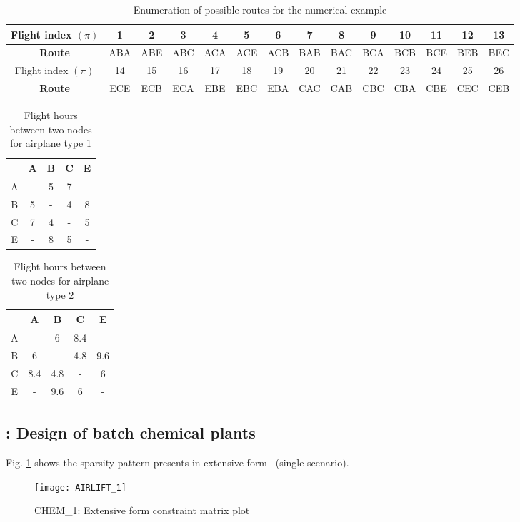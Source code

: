 \begin{table}[]
	\caption{Enumeration of possible routes for the numerical example \cite{journal:AF2004}}
	\resizebox{\textwidth}{!}
	{
	\begin{tabular}{|c|c|c|c|c|c|c|c|c|c|c|c|c|c|}
		\hline
		Flight index $(\pi)$                           & 1   & 2   & 3   & 4   & 5   & 6   & 7   & 8   & 9   & 10  & 11  & 12  & 13  \\ \hline
		\textbf{Route} & ABA & ABE & ABC & ACA & ACE & ACB & BAB & BAC & BCA & BCB & BCE & BEB & BEC \\ \hline
		Flight index $(\pi)$                           & 14  & 15  & 16  & 17  & 18  & 19  & 20  & 21  & 22  & 23  & 24  & 25  & 26  \\ \hline
		\textbf{Route} & ECE & ECB & ECA & EBE & EBC & EBA & CAC & CAB & CBC & CBA & CBE & CEC & CEB \\ \hline
	\end{tabular}
	}
\end{table}

\begin{table}[H]
	\centering
	\caption{Flight hours between two nodes for airplane type 1 \cite{journal:AF2004}}
	\begin{tabular}{|c|c|c|c|c|}
		\hline
		& A & B & C & E \\ \hline
		A & - & 5 & 7 & - \\ \hline
		B & 5 & - & 4 & 8 \\ \hline
		C & 7 & 4 & - & 5 \\ \hline
		E & - & 8 & 5 & - \\ \hline
	\end{tabular}
\end{table}

\begin{table}[H]
	\centering
	\caption{Flight hours between two nodes for airplane type 2 \cite{journal:AF2004}}
	\begin{tabular}{|c|c|c|c|c|}
		\hline
		& A & B & C & E \\ \hline
		A & - & 6 & 8.4 & - \\ \hline
		B & 6 & - & 4.8 & 9.6 \\ \hline
		C & 8.4 & 4.8 & - & 6 \\ \hline
		E & - & 9.6 & 6 & - \\ \hline
	\end{tabular}
\end{table}

\subsection{\chem: Design of batch chemical plants} \label{CHEM}
Fig. \ref{fig:chem_sparsity} shows the sparsity pattern presents in extensive form \chem\ (single scenario).
\begin{figure}[H]
	\centering
	\texttt{[image: AIRLIFT\_1]}
	\caption{CHEM\_1: Extensive form constraint matrix plot}
	\label{fig:chem_sparsity}
\end{figure}

